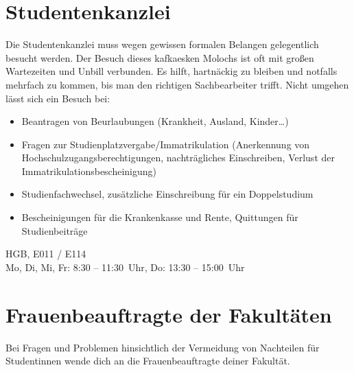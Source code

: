 \begin{urlList}
\end{urlList}

\section{Studentenkanzlei}

Die Studentenkanzlei muss wegen gewissen formalen Belangen
gelegentlich besucht werden. Der Besuch dieses kafkaesken Molochs ist
oft mit großen Wartezeiten und Unbill verbunden. Es hilft, hartnäckig
zu bleiben und notfalls mehrfach zu kommen, bis man den richtigen
Sachbearbeiter trifft. Nicht umgehen lässt sich ein Besuch bei:

\begin{itemize}
\item Beantragen von Beurlaubungen (Krankheit, Ausland, Kinder\ldots)
\item Fragen zur Studienplatzvergabe/Immatrikulation (Anerkennung von Hochschulzugangsberechtigungen, nachträgliches Einschreiben, Verlust der Immatrikulationsbescheinigung)
\item Studienfachwechsel, zusätzliche Einschreibung für ein Doppelstudium
\item Bescheinigungen für die Krankenkasse und Rente, Quittungen für Studienbeiträge
\end{itemize}

HGB, E011 / E114\\
Mo, Di, Mi, Fr: 8:30 -- 11:30~Uhr, Do: 13:30 -- 15:00~Uhr

\begin{urlList}
\end{urlList}

%

\section{Frauenbeauftragte der Fakultäten}
Bei Fragen und Problemen hinsichtlich der Vermeidung von Nachteilen für Studentinnen
wende dich an die Frauenbeauftragte deiner Fakultät.



